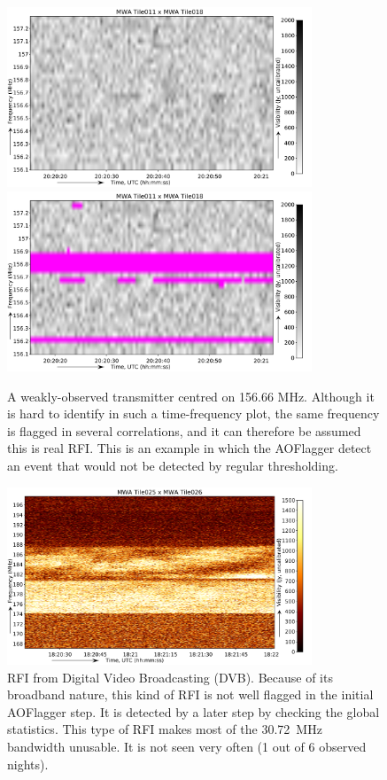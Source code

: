 \documentclass[useAMS,usenatbib]{mn2e}
\begin{document}
\noindent\begin{figure}
\begin{center}\hspace*{-0.2cm}\includegraphics[width=9.1cm]{img/156_7_mhz_example}\includegraphics[width=9.1cm]{img/156_7_mhz_flagged}
\caption{A weakly-observed transmitter centred on 156.66 MHz. Although it is hard to identify in such a time-frequency plot, the same frequency is flagged in several correlations, and it can therefore be assumed this is real RFI. This is an example in which the AOFlagger detect an event that would not be detected by regular thresholding. }
\label{fig:156_7}
\end{center}
\end{figure}

\noindent\begin{figure}
\begin{center}\hspace*{-0.2cm}\includegraphics[width=9.1cm]{img/dvb_example}
\caption{RFI from Digital Video Broadcasting (DVB). Because of its broadband nature, this kind of RFI is not well flagged in the initial AOFlagger step. It is detected by a later step by checking the global statistics. This type of RFI makes most of the 30.72~MHz bandwidth unusable. It is not seen very often (1 out of 6 observed nights). }
\label{fig:dvb_example}
\end{center}
\end{figure}
\end{document}
